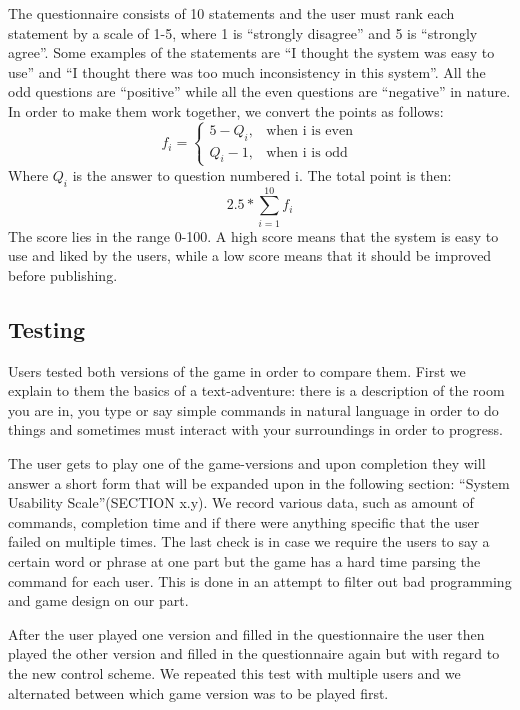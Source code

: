 The questionnaire consists of 10 statements and the user must rank each statement by a scale of 1-5, where 1 is “strongly disagree” and 5 is “strongly agree”. Some examples of the statements are “I thought the system was easy to use” and “I thought there was too much inconsistency in this system”. All the odd questions are ``positive'' while all the even questions are ``negative'' in nature. In order to make them work together, we convert the points as follows: 
\[
    f_{i} = 
\begin{cases}
    5 - Q_{i}, & \text{when i is even}\\
    Q_{i} - 1, & \text{when i is odd}
\end{cases}
\]
Where \(Q_{i} \) is the answer to question numbered i. The total point is then: 
\[ 2.5 * \displaystyle \sum_{i=1}^{10} f_{i} \]
The score lies in the range 0-100. A high score means that the system is easy to use and liked by the users, while a low score means that it should be improved before publishing. \citep{Broo}

\subsection{Testing}
Users tested both versions of the game in order to compare them. First we explain to them the basics of a text-adventure: there is a description of the room you are in, you type or say simple commands in natural language in order to do things and sometimes must interact with your surroundings in order to progress. 

The user gets to play one of the game-versions and upon completion they will answer a short form that will be expanded upon in the following section: “System Usability Scale”(SECTION x.y). We record various data, such as amount of commands, completion time and if there were anything specific that the user failed on multiple times. The last check is in case we require the users to say a certain word or phrase at one part but the game has a hard time parsing the command for each user. This is done in an attempt to filter out bad programming and game design on our part.

After the user played one version and filled in the questionnaire the user then played the other version and filled in the questionnaire again but with regard to the new control scheme. We repeated this test with multiple users and we alternated between which game version was to be played first.